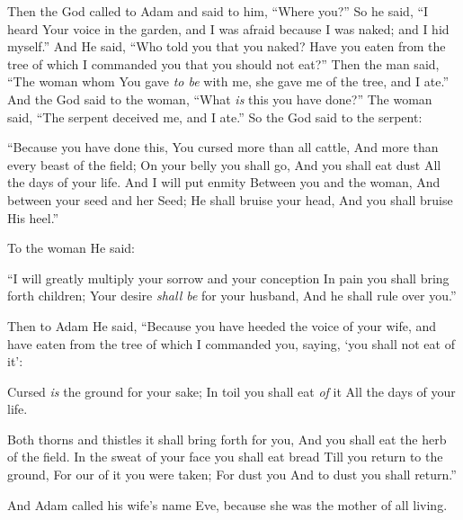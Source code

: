 \bverse Then the \lord God called to Adam and said to him, ``Where \are you?''
\bverse So he said, ``I heard Your voice in the garden, and I was afraid because I was naked; and I hid myself.''
\bverse And He said, ``Who told you that you \were naked? Have you eaten from the tree of which I commanded you that you should not eat?''
\bverse Then the man said, ``The woman whom You gave \textit{to be} with me, she gave me of the tree, and I ate.''
\bverse And the \lord God said to the woman, ``What \textit{is} this you have done?'' The woman said, ``The serpent deceived me, and I ate.''
\bverse So the \lord God said to the serpent: 
\begin{bquotation}
``Because you have done this, You \are cursed more than all cattle, And more than every beast of the field; On your belly you shall go, And you shall eat dust All the days of your life.
\bverse And I will put enmity Between you and the woman, And between your seed and her Seed; He shall bruise your head, And you shall bruise His heel.''
\end{bquotation}
\bverse To the woman He said: 
\begin{bquotation}
``I will greatly multiply your sorrow and your conception In pain you shall bring forth children; Your desire \textit{shall be} for your husband, And he shall rule over you.''
\end{bquotation}
\bverse Then to Adam He said, ``Because you have heeded the voice of your wife, and have eaten from the tree of which I commanded you, saying, `you shall not eat of it':
\begin{bquotation}
Cursed \textit{is} the ground for your sake; In toil you shall eat \textit{of} it All the days of your life.

\bverse Both thorns and thistles it shall bring forth for you, And you shall eat the herb of the field.
\bverse In the sweat of your face you shall eat bread Till you return to the ground, For our of it you were taken; For dust you \are And to dust you shall return.''
\end{bquotation}
\bverse And Adam called his wife's name Eve, because she was the mother of all living.

